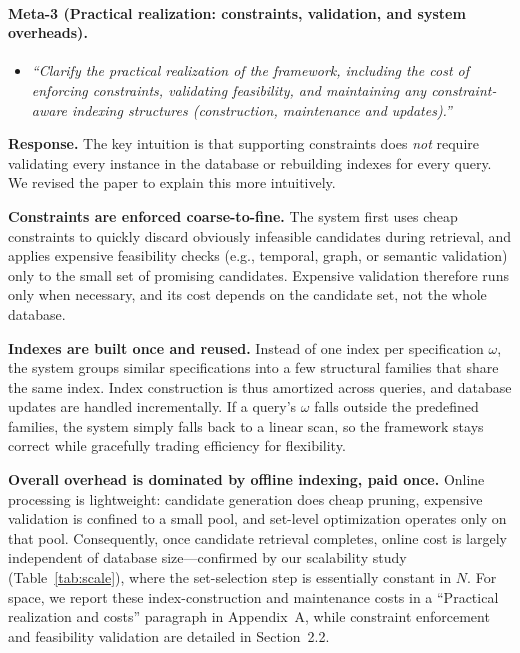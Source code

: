 \paragraph{Meta-3 (Practical realization: constraints, validation, and system overheads).}

\begin{itemize}[leftmargin=1.2em, itemsep=1pt, topsep=2pt]
\item \textit{``Clarify the practical realization of the framework, including the cost of enforcing constraints, validating feasibility, and maintaining any constraint-aware indexing structures (construction, maintenance and updates).''}
\end{itemize}
\smallskip

\noindent\textbf{Response.}
The key intuition is that supporting constraints does \emph{not} require validating every instance in the database or rebuilding indexes for every query. We revised the paper to explain this more intuitively.

\textbf{Constraints are enforced coarse-to-fine.} The system first uses cheap constraints to quickly discard obviously infeasible candidates during retrieval, and applies expensive feasibility checks (e.g., temporal, graph, or semantic validation) only to the small set of promising candidates. Expensive validation therefore runs only when necessary, and its cost depends on the candidate set, not the whole database.

\textbf{Indexes are built once and reused.} Instead of one index per specification $\omega$, the system groups similar specifications into a few structural families that share the same index. Index construction is thus amortized across queries, and database updates are handled incrementally. If a query's $\omega$ falls outside the predefined families, the system simply falls back to a linear scan, so the framework stays correct while gracefully trading efficiency for flexibility.

\textbf{Overall overhead is dominated by offline indexing, paid once.} Online processing is lightweight: candidate generation does cheap pruning, expensive validation is confined to a small pool, and set-level optimization operates only on that pool. Consequently, once candidate retrieval completes, online cost is largely independent of database size---confirmed by our scalability study (Table~\ref{tab:scale}), where the set-selection step is essentially constant in $N$. For space, we report these index-construction and maintenance costs in a ``Practical realization and costs'' paragraph in Appendix~A, while constraint enforcement and feasibility validation are detailed in Section~2.2.

